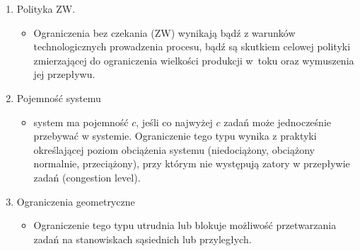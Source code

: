 \documentclass[10pt, a
4paper]{article}
\begin{document}
\begin{enumerate}
\begin{itemize}
    \end{itemize}
	\item Polityka ZW.
    \begin{itemize}
    	\item Ograniczenia bez czekania (ZW) wynikają bądź z warunków technologicznych
		  	  prowadzenia procesu, bądź są skutkiem celowej polityki zmierzającej do
		  	  ograniczenia wielkości produkcji w~toku oraz wymuszenia jej przepływu.
    \end{itemize}
	\item Pojemność systemu
    \begin{itemize}
   		\item system ma pojemność $c$, jeśli co najwyżej $c$ zadań może jednocześnie
				przebywać w systemie. Ograniczenie tego typu wynika z praktyki
				określającej poziom obciążenia systemu (niedociążony, obciążony normalnie,
				przeciążony), przy którym nie występują zatory w przepływie zadań (congestion level).
    \end{itemize}
	\item Ograniczenia geometryczne
    \begin{itemize}
    	\item Ograniczenie tego typu utrudnia lub blokuje możliwość przetwarzania
				zadań na stanowiskach sąsiednich lub przyległych.
    \end{itemize}
\end{enumerate}
\end{document}
